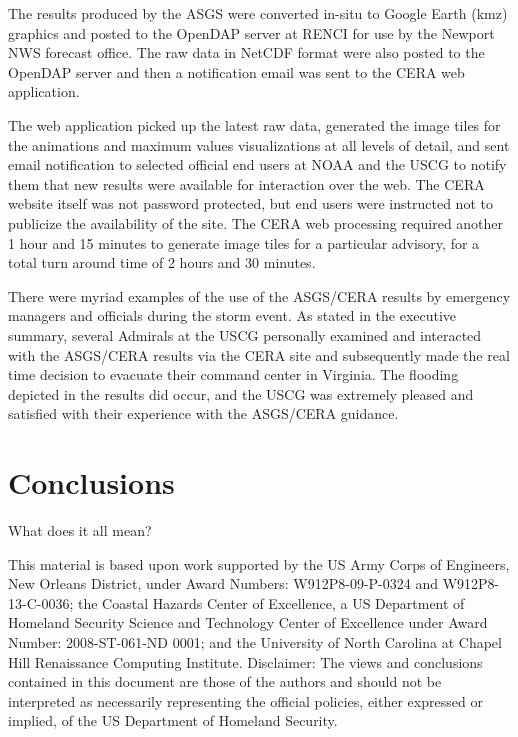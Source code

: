 \documentclass[jmse,article,submit,moreauthors,pdftex,12pt,a4paper]{mdpi}
\begin{document}

The results produced by the ASGS were converted in-situ to Google 
Earth (kmz) graphics and posted to the OpenDAP server at RENCI for 
use by the Newport NWS forecast office. The raw data in NetCDF 
format were also posted to the OpenDAP server and then a 
notification email was sent to the CERA web application. 

The web application picked up the latest raw data, generated the 
image tiles for the animations and maximum values visualizations at 
all levels of detail, and sent email notification to selected 
official end users at NOAA and the USCG to notify them that new 
results were available for interaction over the web. The CERA 
website itself was not password protected, but end users were 
instructed not to publicize the availability of the site. The CERA 
web processing required another 1 hour and 15 minutes to generate 
image tiles for a particular advisory, for a total turn around time 
of 2 hours and 30 minutes.

There were myriad examples of the use of the ASGS/CERA results by 
emergency managers and officials during the storm event. As stated 
in the executive summary, several Admirals at the USCG personally 
examined and interacted with the ASGS/CERA results via the CERA site 
and subsequently made the real time decision to evacuate their 
command center in Virginia. The flooding depicted in the results did 
occur, and the USCG was extremely pleased and satisfied with their 
experience with the ASGS/CERA guidance.

\section{Conclusions}

What does it all mean?



This material is based upon work supported by the US Army Corps of 
Engineers, New Orleans District, under Award Numbers: 
W912P8-09-P-0324 and W912P8-13-C-0036; the Coastal Hazards Center of 
Excellence, a US Department of Homeland Security Science and 
Technology Center of Excellence under Award Number: 2008-ST-061-ND 
0001; and the University of North Carolina at Chapel Hill 
Renaissance Computing Institute. Disclaimer: The views and 
conclusions contained in this document are those of the authors and 
should not be interpreted as necessarily representing the official 
policies, either expressed or implied, of the US Department of 
Homeland Security.
\end{document}

